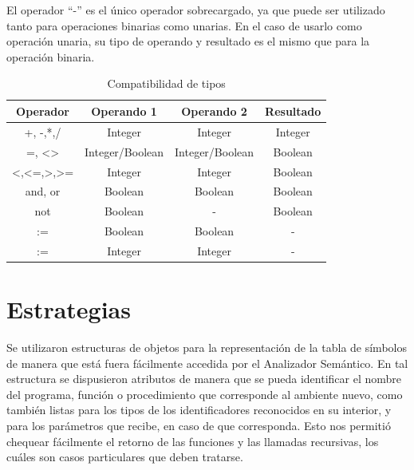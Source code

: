 El operador ``-'' es el único operador sobrecargado, ya que puede ser utilizado tanto para operaciones binarias como unarias. En el caso de usarlo como operación unaria, su tipo de operando y resultado es el mismo que para la operación binaria. 
\begin{table}[H]
\centering
\begin{tabular}{|c|c|c|c|}
\hline
Operador                                                & Operando 1      & Operando 2      & Resultado \\ \hline
+, -,*,/                                                & Integer         & Integer         & Integer   \\ \hline
=, \textless{}\textgreater{}                            & Integer/Boolean & Integer/Boolean & Boolean   \\ \hline
\textless{},\textless{}=,\textgreater{},\textgreater{}= & Integer         & Integer         & Boolean   \\ \hline
and, or                                                 & Boolean         & Boolean         & Boolean   \\ \hline
not                                                     & Boolean         & -               & Boolean   \\ \hline
:=                                                      & Boolean         & Boolean         & -         \\ \hline
:=                                                      & Integer         & Integer         & -         \\ \hline
\end{tabular}
\caption{Compatibilidad de tipos}
\label{tab:compatibilidad}
\end{table}

\section{Estrategias}
Se utilizaron estructuras de objetos para la representación de la tabla de símbolos de manera que está fuera fácilmente accedida por el Analizador Semántico. En tal estructura se dispusieron atributos de manera que se pueda identificar el nombre del programa, función o procedimiento que corresponde al ambiente nuevo, como también listas para los tipos de los identificadores reconocidos en su interior, y para los parámetros que recibe, en caso de que corresponda. Esto nos permitió chequear fácilmente el retorno de las funciones y las llamadas recursivas, los cuáles son casos particulares que deben tratarse.

